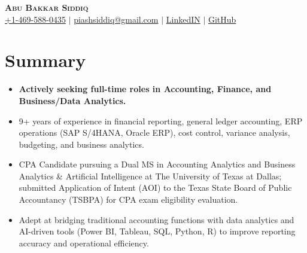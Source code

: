 \documentclass[letterpaper,11pt]{article}
\newcommand{\resumeItem}[1]{
  \item\small{
    {#1 \vspace{-3pt}}
  }
}
\newcommand{\resumeItemListStart}{\begin{itemize}}
\newcommand{\resumeItemListEnd}{\end{itemize}\vspace{-3pt}}
\begin{document}

\begin{center}
    \textbf{\Huge \scshape Abu Bakkar Siddiq} \\ \vspace{3pt}
    \small
    \faMobile \hspace{.5pt} \href{tel:+14695880435}{+1-469-588-0435}
    $|$
    \faAt \hspace{.5pt} \href{mailto:piashsiddiq@gmail.com}{piashsiddiq@gmail.com}
    $|$
    \faLinkedinSquare \hspace{.5pt} \href{https://www.linkedin.com/in/abu-siddiq-bakkar/}{LinkedIN}
    $|$
    \faGithub \hspace{.5pt} \href{https://github.com/piashsiddiq}{GitHub}
   
\end{center}

 \vspace{-20pt}
\section{Summary}
 \vspace{-5pt}
\resumeItemListStart \resumeItem {\textbf{Actively seeking full-time roles in Accounting, Finance, and Business/Data Analytics.}} 
  \vspace{-5pt}
\resumeItem{9+ years of experience in financial reporting, general ledger accounting, ERP operations (SAP S/4HANA, Oracle ERP), cost control, variance analysis, budgeting, and business analytics.}  
 \vspace{-5pt}
 \resumeItem{CPA Candidate pursuing a Dual MS in Accounting Analytics and Business Analytics \& Artificial Intelligence at The University of Texas at Dallas; submitted Application of Intent (AOI) to the Texas State Board of Public Accountancy (TSBPA) for CPA exam eligibility evaluation.} 
\vspace{-5pt}
\resumeItem{Adept at bridging traditional accounting functions with data analytics and AI-driven tools (Power BI, Tableau, SQL, Python, R) to improve reporting accuracy and operational efficiency.}
\vspace{-10pt}\resumeItemListEnd
\end{document}

